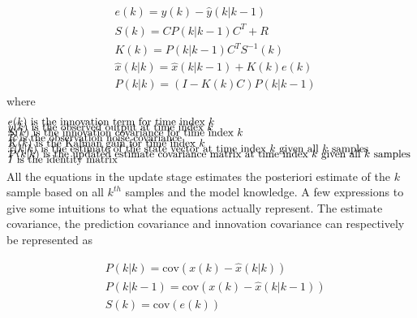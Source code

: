 \begin{align}
	&{e}			(k) 		= {y}(k) - \hat{{y}}(k|k-1)							\label{eq:Kalman_upd_inno}			\\
	&{S}			(k) 		= {C}{P}(k|k-1){C}^T + {R}				\label{eq:Kalman_upd_inno_cov}		\\
	&{K}			(k) 		= {P}(k|k-1){C}^T{S}^{-1}(k)					\label{eq:Kalman_upd_kalman_gain}	\\
	&\hat{{x}}	(k|k) 		= \hat{{x}}(k|k-1) + {K}(k){e}(k) 				\label{eq:Kalman_upd_est_state}		\\
	&{P}			(k|k) 		= ({I} - {K}(k){C}){P}(k|k-1)			\label{eq:Kalman_upd_est_cov}
\end{align}
where 
\begin{align*}
	&\text{${e}		(k)$ 		is the innovation term for time index 					$ k $													}	\\[-1em]
	&\text{${y}		(k)$ 		is the observed output at time index 					$ k $													}	\\[-1em]
	&\text{${S}		(k)$ 		is the innovation covariance for time index 			$ k $											}	\\[-1em]
	&\text{${R}$ 				is the observation noise covariance																}	\\[-1em]
	&\text{${K}		(k)$ 		is the Kalman gain for time index 						$ k $													}	\\[-1em]
	&\text{$\hat{{x}}(k|k)$ 	is the estimate of the state vector at time index 			$ k $ given all 	$ k$ samples	}	\\[-1em]
	&\text{${P}		(k|k)$ 	is the updated estimate covariance matrix at time index 	$ k $ given all 	$ k$ samples		}	\\[-1em]
	&\text{${I}$ 				is the identity matrix																				}	\\[-1em]			
\end{align*}

All the equations in the update stage estimates the posteriori estimate of the $ k $ sample based on all $ k^{th} $ samples and the model knowledge. A few expressions to give some intuitions to what the equations actually represent. The estimate covariance, the prediction covariance and innovation covariance can respectively be represented as 

\begin{align}
	&{P}(k|k) 	= \text{cov}({x}(k)-	\hat{{x}}(k|k))	\\
	&{P}(k|k-1) 	= \text{cov}({x}(k)-	\hat{{x}}(k|k-1)) 		\\
	&{S}(k) 		= \text{cov}({e}(k)) 
\end{align}

